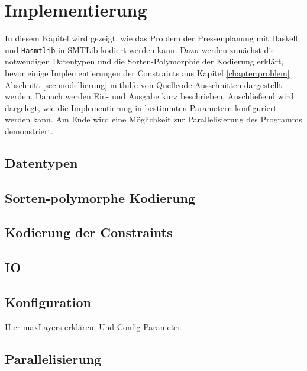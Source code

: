 \chapter{Implementierung}
\label{chapter:implementierung}
In diesem Kapitel wird gezeigt, wie das Problem der Pressenplanung mit Haskell und \texttt{Hasmtlib} in SMTLib kodiert werden kann.
Dazu werden zunächst die notwendigen Datentypen und die Sorten-Polymorphie der Kodierung erklärt, bevor einige Implementierungen der Constraints aus
Kapitel \ref{chapter:problem} Abschnitt \ref{sec:modellierung} mithilfe von Quellcode-Ausschnitten dargestellt werden.
Danach werden Ein- und Ausgabe kurz beschrieben.
Anschließend wird dargelegt, wie die Implementierung in bestimmten Parametern konfiguriert werden kann.
Am Ende wird eine Möglichkeit zur Parallelisierung des Programms demonstriert.

\section{Datentypen}

\section{Sorten-polymorphe Kodierung}

\section{Kodierung der Constraints}
\label{sec:kodierungconstraints}

\section{IO}

\section{Konfiguration}
Hier maxLayers erklären.
Und Config-Parameter.

\section{Parallelisierung}